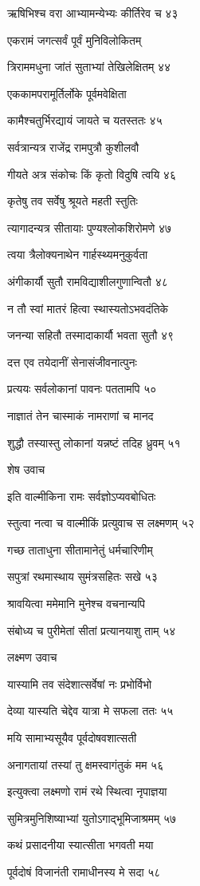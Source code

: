 ऋषिभिश्च वरा आभ्यामन्येभ्यः कीर्तिरेव च ४३

एकरामं जगत्सर्वं पूर्वं मुनिविलोकितम्

त्रिराममधुना जांतं सुताभ्यां तेखिलेक्षितम् ४४

एककामपरामूर्तिर्लोके पूर्वमवेक्षिता

कामैश्चतुर्भिरद्यायं जायते च यतस्ततः ४५

सर्वत्रान्यत्र राजेंद्र रामपुत्रौ कुशीलवौ

गीयते अत्र संकोचः किं कृतो विदुषि त्वयि ४६

कृतेषु तव सर्वेषु श्रूयते महती स्तुतिः

त्यागादन्यत्र सीतायाः पुण्यश्लोकशिरोमणे ४७

त्वया त्रैलोक्यनाथेन गार्हस्थ्यमनुकुर्वता

अंगीकार्यौ सुतौ रामविद्याशीलगुणान्वितौ ४८

न तौ स्वां मातरं हित्वा स्थास्यतोऽभवदंतिके

जनन्या सहितौ तस्मादाकार्यौ भवता सुतौ ४९

दत्त एव तयेदानीं सेनासंजीवनात्पुनः

प्रत्ययः सर्वलोकानां पावनः पततामपि ५०

नाज्ञातं तेन चास्माकं नामराणां च मानद

शुद्धौ तस्यास्तु लोकानां यन्नष्टं तदिह ध्रुवम् ५१

शेष उवाच

इति वाल्मीकिना रामः सर्वज्ञोऽप्यवबोधितः

स्तुत्वा नत्वा च वाल्मीकिं प्रत्युवाच स लक्ष्मणम् ५२

गच्छ ताताधुना सीतामानेतुं धर्मचारिणीम्

सपुत्रां रथमास्थाय सुमंत्रसहितः सखे ५३

श्रावयित्वा ममेमानि मुनेश्च वचनान्यपि

संबोध्य च पुरीमेतां सीतां प्रत्यानयाशु ताम् ५४

लक्ष्मण उवाच

यास्यामि तव संदेशात्सर्वेषां नः प्रभोर्विभो

देव्या यास्यति चेद्देव यात्रा मे सफला ततः ५५

मयि सामाभ्यसूयैव पूर्वदोषवशात्सती

अनागतायां तस्यां तु क्षमस्वागंतुकं मम ५६

इत्युक्त्वा लक्ष्मणो रामं रथे स्थित्वा नृपाज्ञया

सुमित्रमुनिशिष्याभ्यां युतोऽगाद्भूमिजाश्रमम् ५७

कथं प्रसादनीया स्यात्सीता भगवती मया

पूर्वदोषं विजानंती रामाधीनस्य मे सदा ५८

